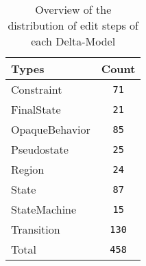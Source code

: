 \begin{table} 
 \center 
 \small 
\begin{tabular}{|l|c|}
\hline
Types & Count\\ 
  \hline 
Constraint & \texttt{71}\\ 
  \hline 
FinalState & \texttt{21}\\ 
  \hline 
OpaqueBehavior & \texttt{85}\\ 
  \hline 
Pseudostate & \texttt{25}\\ 
  \hline 
Region & \texttt{24}\\ 
  \hline 
State & \texttt{87}\\ 
  \hline 
StateMachine & \texttt{15}\\ 
  \hline 
Transition & \texttt{130}\\ 
  \hline 
Total & \texttt{458}\\ 
  \hline 
\end{tabular}
\caption[Overview: Delta-Models]{Overview of the distribution of edit steps of each Delta-Model}
\end{table}

